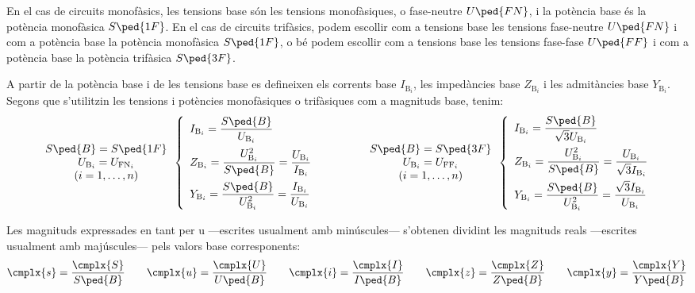 En el cas de circuits monofàsics, les tensions base són les tensions monofàsiques, o fase-neutre $U\ped{FN}$, i la potència base és la potència monofàsica $S\ped{1F}$. En el cas de circuits trifàsics, podem escollir com a tensions base les tensions fase-neutre $U\ped{FN}$ i com a potència base la potència  monofàsica $S\ped{1F}$, o bé podem escollir com a tensions base les tensions fase-fase $U\ped{FF}$ i com a potència base la potència trifàsica $S\ped{3F}$.

A partir de la potència base i de les tensions base es
defineixen els corrents base $I_{\text{B}_i}$, les impedàncies base $Z_{\text{B}_i}$ i les
admitàncies base $Y_{\text{B}_i}$. Segons que s'utilitzin les tensions i potències monofàsiques o trifàsiques com a magnituds base, tenim:
\begin{equation}
\begin{array}{c}  S\ped{B}=S\ped{1F} \\ U_{\text{B}_i} = U_{\text{FN}_i} \\ (i=1,\ldots,n) \end{array}
\left\{
\begin{array}{l}
   I_{\text{B}_i} = \dfrac{S\ped{B}}{U_{\text{B}_i}} \\[2.5ex]
   Z_{\text{B}_i} = \dfrac{U_{\text{B}_i}^2}{S\ped{B}} = \dfrac{U_{\text{B}_i}}{I_{\text{B}_i}} \\[2.5ex]
   Y_{\text{B}_i} = \dfrac{S\ped{B}}{U_{\text{B}_i}^2} = \dfrac{I_{\text{B}_i}}{U_{\text{B}_i}}
\end{array}
\right.
\qquad\qquad
\begin{array}{c} S\ped{B}=S\ped{3F} \\ U_{\text{B}_i} = U_{\text{FF}_i} \\ (i=1,\ldots,n) \end{array}
\left\{
\begin{array}{l}
   I_{\text{B}_i} = \dfrac{S\ped{B}}{\sqrt{3} U_{\text{B}_i}} \\[2.5ex]
   Z_{\text{B}_i} = \dfrac{U_{\text{B}_i}^2}{S\ped{B}}= \dfrac{U_{\text{B}_i}}{\sqrt{3} I_{\text{B}_i}} \\[2.5ex]
   Y_{\text{B}_i} = \dfrac{S\ped{B}}{U_{\text{B}_i}^2} = \dfrac{\sqrt{3} I_{\text{B}_i}}{U_{\text{B}_i}}
\end{array}
\right.
\label{eq:bases_pu}
\end{equation}

Les magnituds expressades en tant per u ---escrites usualment amb minúscules--- s'obtenen
dividint les magnituds reals ---escrites usualment amb majúscules--- pels valors base corresponents:
\begin{equation}
   \cmplx{s} = \frac{\cmplx{S}}{S\ped{B}} \qquad \cmplx{u} = \frac{\cmplx{U}}{U\ped{B}} \qquad \cmplx{i} = \frac{\cmplx{I}}{I\ped{B}} \qquad \cmplx{z} = \frac{\cmplx{Z}}{Z\ped{B}} \qquad \cmplx{y} = \frac{\cmplx{Y}}{Y\ped{B}}
\end{equation}

